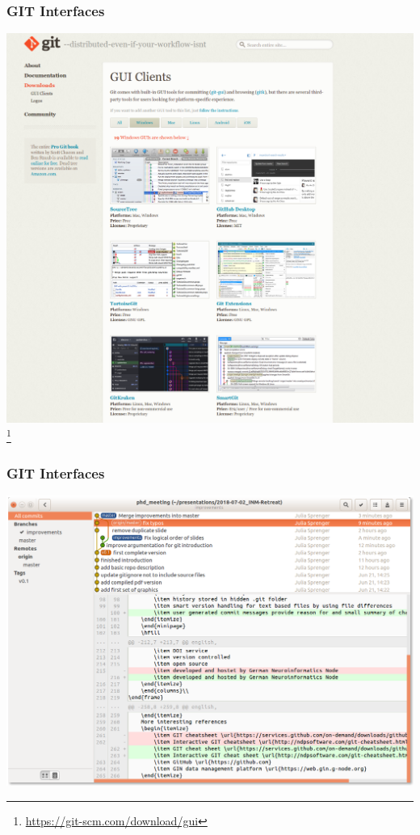 \documentclass[
t, %
10pt, %
aspectratio=1610, %
ngerman,
english,
]{beamer}
\newcommand\blfootnote[1]{%
  \begingroup
  \renewcommand\thefootnote{}\footnote{#1}%
  \addtocounter{footnote}{-1}%
  \endgroup
}
\begin{document}
\begin{frame}
    \frametitle{GIT Interfaces}
    \centering
    \includegraphics[height=0.8\textheight]{graphics/Screenshot_GUI_Clients.png}\\
    \blfootnote{\url{https://git-scm.com/download/gui}}
\end{frame}

\begin{frame}
    \frametitle{GIT Interfaces}
    \centering
    \includegraphics[height=0.8\textheight]{graphics/Screenshot_gitg-3.png}\\
\end{frame}
\end{document}
